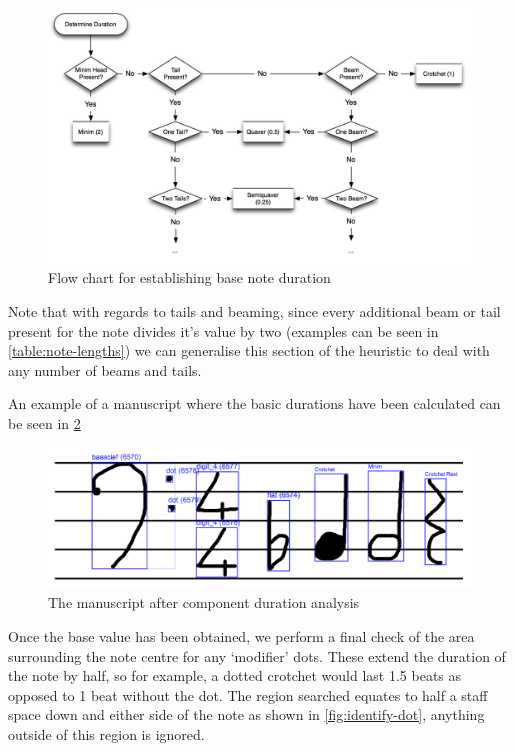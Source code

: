 \begin{figure}[H]
  \includegraphics[width=\linewidth]{gfx/implementation/duration-diagram.png}
  \caption{Flow chart for establishing base note duration}
  \label{fig:note-duration-flow-chart}
\end{figure}

Note that with regards to tails and beaming, since every additional beam or tail present for the note divides it's value by two (examples can be seen in \cref{table:note-lengths}) we can generalise this section of the heuristic to deal with any number of beams and tails.

An example of a manuscript where the basic durations have been calculated can be seen in \cref{fig:canvas-durations}

\begin{figure}[hbt]
  \includegraphics[width=\linewidth]{gfx/techniques/labelling/duration.png}
  \caption{The manuscript after component duration analysis}
  \label{fig:canvas-durations}
\end{figure}

Once the base value has been obtained, we perform a final check of the area surrounding the note centre for any `modifier' dots. These extend the duration of the note by half, so for example, a dotted crotchet would last 1.5 beats as opposed to 1 beat without the dot. The region searched equates to half a staff space down and either side of the note as shown in \cref{fig:identify-dot}, anything outside of this region is ignored.

